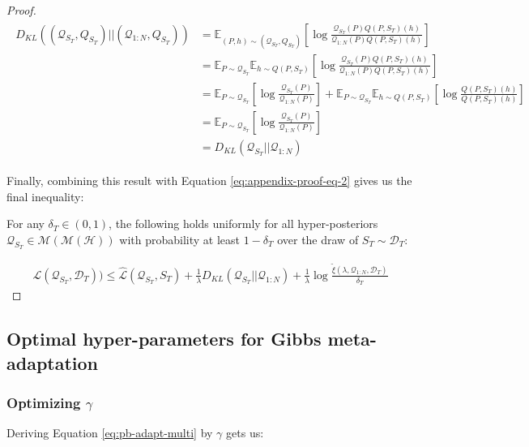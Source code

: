 \documentclass{article}
\theoremstyle{definition}
\newcommand{\Expect}[2]{\mathbb{E}_{#1}\left [#2 \right ]}
\begin{document}
\begin{proof}
	\begin{align*}
	\begin{split}
	D_{KL}((\mathcal{Q}_{S_T}, Q_{S_T})||(\mathcal{Q}_{1:N}, Q_{S_T}))&=\Expect{(P,h)\sim (\mathcal{Q}_{S_T},Q_{S_T})}{\log\frac{\mathcal{Q}_{S_T}(P)Q(P, S_T)(h)}{\mathcal{Q}_{1:N}(P)Q(P, S_T)(h)}}\\
	&=\mathbb{E}_{P\sim \mathcal{Q}_{S_T}}\Expect{h\sim Q(P,S_T)}{\log\frac{\mathcal{Q}_{S_T}(P)Q(P, S_T)(h)}{\mathcal{Q}_{1:N}(P)Q(P, S_T)(h)}}\\
	&=\Expect{P\sim \mathcal{Q}_{S_T}}{\log\frac{\mathcal{Q}_{S_T}(P)}{\mathcal{Q}_{1:N}(P)}}+\mathbb{E}_{P\sim \mathcal{Q}_{S_T}}\Expect{h\sim Q(P,S_T)}{\log\frac{Q(P, S_T)(h)}{Q(P, S_T)(h)}}\\
	&=\Expect{P\sim \mathcal{Q}_{S_T}}{\log\frac{\mathcal{Q}_{S_T}(P)}{\mathcal{Q}_{1:N}(P)}}\\
	&=D_{KL}(\mathcal{Q}_{S_T}||\mathcal{Q}_{1:N})
	\end{split}
	\end{align*}
	
	Finally, combining this result with Equation \ref{eq:appendix-proof-eq-2} gives us the final inequality:
	
	For any $\delta_T \in (0,1)$, the following holds uniformly for all hyper-posteriors $\mathcal{Q}_{S_T}\in \mathcal{M}(\mathcal{M}(\mathcal{H}))$ with probability at least $1-\delta_T$ over the draw of $S_T\sim \mathcal{D}_T$:
	
	\begin{align*}
	\mathcal{L}(\mathcal{Q}_{S_T}, \mathcal{D}_T)) \leq \hat{\mathcal{L}}(\mathcal{Q}_{S_T}, S_T) + \frac{1}{\lambda}D_{KL}(\mathcal{Q}_{S_T}||\mathcal{Q}_{1:N})
	+\frac{1}{\lambda}\log\frac{\tilde{\xi}(\lambda,\mathcal{Q}_{1:N},\mathcal{D}_T)}{\delta_T}
	\end{align*}
	\end{proof}

\subsection{Optimal hyper-parameters for Gibbs meta-adaptation} \label{append:optimiziation}

\subsubsection{Optimizing $\gamma$}

Deriving Equation \ref{eq:pb-adapt-multi} by $\gamma$ gets us:
\end{document}
